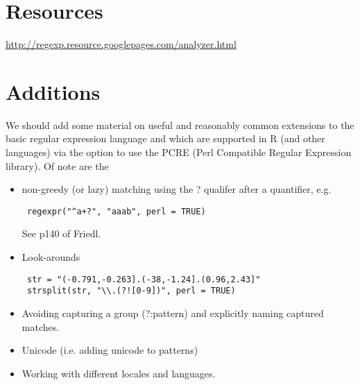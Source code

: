 \section{Resources}
\url{http://regexp.resource.googlepages.com/analyzer.html}


\section{Additions}
We should add some material on useful and reasonably common extensions to the basic regular
expression language and which are supported in R (and other languages) via the 
 option to use the PCRE (Perl Compatible Regular Expression library).
Of note are the 
\begin{itemize}
\item non-greedy (or lazy) matching using the ? qualifer after a quantifier, e.g.
\begin{verbatim}
 regexpr("^a+?", "aaab", perl = TRUE) 
\end{verbatim}
See p140 of Friedl.
\item Look-arounds
\begin{verbatim}
 str = "(-0.791,-0.263].(-38,-1.24].(0.96,2.43]"
 strsplit(str, "\\.(?![0-9])", perl = TRUE)
\end{verbatim}
\item Avoiding capturing a group  (?:pattern)
and explicitly naming captured matches.
\item Unicode (i.e. adding unicode to patterns)
\item Working with different locales and languages.
\end{itemize}
